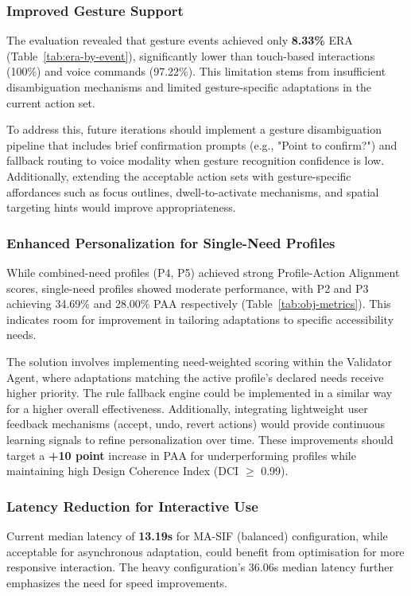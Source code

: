 \subsubsection{Improved Gesture Support}
The evaluation revealed that gesture events achieved only \textbf{8.33\%} ERA (Table~\ref{tab:era-by-event}), significantly lower than touch-based interactions (100\%) and voice commands (97.22\%). This limitation stems from insufficient disambiguation mechanisms and limited gesture-specific adaptations in the current action set.

To address this, future iterations should implement a gesture disambiguation pipeline that includes brief confirmation prompts (e.g., "Point to confirm?") and fallback routing to voice modality when gesture recognition confidence is low. Additionally, extending the acceptable action sets with gesture-specific affordances such as focus outlines, dwell-to-activate mechanisms, and spatial targeting hints would improve appropriateness.

\subsubsection{Enhanced Personalization for Single-Need Profiles}
While combined-need profiles (P4, P5) achieved strong Profile-Action Alignment scores, single-need profiles showed moderate performance, with P2 and P3 achieving 34.69\% and 28.00\% PAA respectively (Table~\ref{tab:obj-metrics}). This indicates room for improvement in tailoring adaptations to specific accessibility needs.

The solution involves implementing need-weighted scoring within the Validator Agent, where adaptations matching the active profile's declared needs receive higher priority. The rule fallback engine could be implemented in a similar way for a higher overall effectiveness. Additionally, integrating lightweight user feedback mechanisms (accept, undo, revert actions) would provide continuous learning signals to refine personalization over time. These improvements should target a \textbf{+10 point} increase in PAA for underperforming profiles while maintaining high Design Coherence Index (DCI $\geq$ 0.99).

\subsubsection{Latency Reduction for Interactive Use}
Current median latency of \textbf{13.19s} for MA-SIF (balanced) configuration, while acceptable for asynchronous adaptation, could benefit from optimisation for more responsive interaction. The heavy configuration's 36.06s median latency further emphasizes the need for speed improvements.

